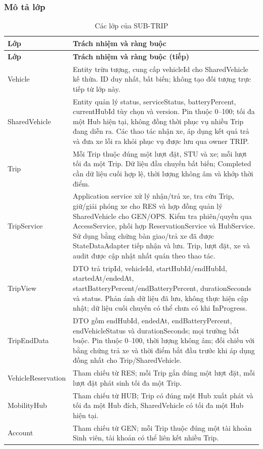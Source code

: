 \subsubsection{Mô tả lớp}
\begin{longtable}{|L{37mm}|L{102mm}|}
\caption{Các lớp của SUB-TRIP}\\\hline
\textbf{Lớp} & \textbf{Trách nhiệm và ràng buộc}\\\hline
\endfirsthead
\hline\textbf{Lớp} & \textbf{Trách nhiệm và ràng buộc (tiếp)}\\\hline\endhead
Vehicle & Entity trừu tượng, cung cấp vehicleId cho SharedVehicle kế thừa. ID duy nhất, bất biến; không tạo đối tượng trực tiếp từ lớp này.\\\hline
SharedVehicle & Entity quản lý status, serviceStatus, batteryPercent, currentHubId tùy chọn và version. Pin thuộc 0--100; tối đa một Hub hiện tại, không đồng thời phục vụ nhiều Trip đang diễn ra. Các thao tác nhận xe, áp dụng kết quả trả và đưa xe lỗi ra khỏi phục vụ được lưu qua owner TRIP.\\\hline
Trip & Mỗi Trip thuộc đúng một lượt đặt, STU và xe; mỗi lượt tối đa một Trip. Dữ liệu đầu chuyến bất biến; Completed cần dữ liệu cuối hợp lệ, thời lượng không âm và khớp thời điểm.\\\hline
TripService & Application service xử lý nhận/trả xe, tra cứu Trip, giữ/giải phóng xe cho RES và hợp đồng quản lý SharedVehicle cho GEN/OPS. Kiểm tra phiên/quyền qua AccessService, phối hợp ReservationService và HubService. Sử dụng bằng chứng bàn giao/trả xe đã được StateDataAdapter tiếp nhận và lưu. Trip, lượt đặt, xe và audit được cập nhật nhất quán theo thao tác.\\\hline
TripView & DTO trả tripId, vehicleId, startHubId/endHubId, startedAt/endedAt, startBatteryPercent/endBatteryPercent, durationSeconds và status. Phản ánh dữ liệu đã lưu, không thực hiện cập nhật; dữ liệu cuối chuyến có thể chưa có khi InProgress.\\\hline
TripEndData & DTO gồm endHubId, endedAt, endBatteryPercent, endVehicleStatus và durationSeconds; mọi trường bắt buộc. Pin thuộc 0--100, thời lượng không âm; đối chiếu với bằng chứng trả xe và thời điểm bắt đầu trước khi áp dụng đồng nhất cho Trip/SharedVehicle.\\\hline
VehicleReservation & Tham chiếu từ RES; mỗi Trip gắn đúng một lượt đặt, mỗi lượt đặt phát sinh tối đa một Trip.\\\hline
MobilityHub & Tham chiếu từ HUB; Trip có đúng một Hub xuất phát và tối đa một Hub đích, SharedVehicle có tối đa một Hub hiện tại.\\\hline
Account & Tham chiếu từ GEN; mỗi Trip thuộc đúng một tài khoản Sinh viên, tài khoản có thể liên kết nhiều Trip.\\\hline
\end{longtable}

